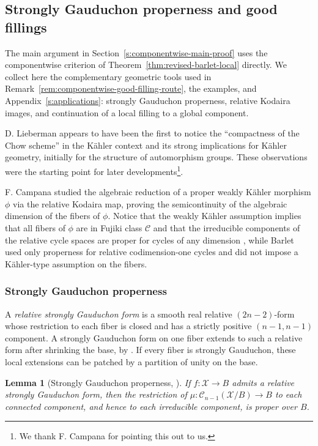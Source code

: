 \documentclass[11pt]{amsart}
\numberwithin{equation}{section}
\theoremstyle{plain}
\newtheorem{lemma}[thm]{Lemma}
\theoremstyle{definition}
\newcommand{\cC}{\mathcal C}
\newcommand{\cX}{\mathcal X}
\begin{document}
\subsection{Strongly Gauduchon properness and good fillings}
\label{ss:revised-good-fillings}

The main argument in Section~\ref{s:componentwise-main-proof} uses the
componentwise criterion of Theorem~\ref{thm:revised-barlet-local}
directly.  We collect here the complementary geometric tools used in
Remark~\ref{rem:componentwise-good-filling-route}, the examples, and
Appendix~\ref{s:applications}: strongly Gauduchon properness, relative
Kodaira images, and continuation of a local filling to a global component.

D. Lieberman \cite{Lb78} appears to have been the first to notice the ``compactness of the Chow scheme'' in the K\"ahler context
and its strong implications for K\"ahler geometry, initially for the structure of automorphism groups. These observations were the starting point for later developments\footnote{We thank F. Campana for pointing this out to us.}.

F. Campana \cite{Ca81} studied the algebraic reduction of a proper weakly K\"ahler morphism $\phi$ via the relative Kodaira map, proving the semicontinuity of the algebraic dimension of the fibers of $\phi$. Notice that the weakly K\"ahler assumption implies that all fibers of $\phi$ are in Fujiki class $\mathcal{C}$ and that the
irreducible components of the relative cycle spaces are proper for cycles
of any dimension \cite[Theorem 4.5 and Proposition 4.8]{Fj78}, while Barlet \cite{Ba15} used only properness for relative codimension-one cycles and did not impose a K\"ahler-type assumption on the fibers.

\subsubsection{Strongly Gauduchon properness}
A \emph{relative strongly Gauduchon form} is a smooth real relative
$(2n-2)$-form whose restriction to each fiber is closed and has a strictly
positive $(n-1,n-1)$ component.  A strongly Gauduchon form on one fiber
extends to such a relative form after shrinking the base, by
\cite[Lemma~3.0.7 and the following remark]{Ba15}.  If every fiber is
strongly Gauduchon, these local extensions can be patched by a partition
of unity on the base.

\begin{lemma}[Strongly Gauduchon properness,
{\cite[Proposition~3.0.6]{Ba15}}]
\label{prop:revised-barlet-proper}
If $f:\cX\to B$ admits a relative strongly Gauduchon form, then
the restriction of $\mu:\cC_{n-1}(\cX/B)\to B$ to each connected
component, and hence to each irreducible component, is proper over $B$.
\end{lemma}
\end{document}
